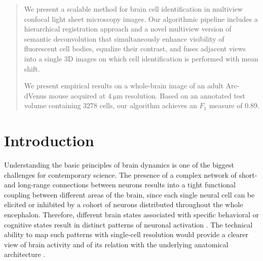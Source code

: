 \documentclass[smallextended]{svjour3}       %
\begin{document}
\maketitle

\begin{abstract}
  We present a scalable method for brain cell identification in
  multiview confocal light sheet microscopy images. Our algorithmic
  pipeline includes a hierarchical registration approach and a novel
  multiview version of semantic deconvolution that simultaneously
  enhance visibility of fluorescent cell bodies, equalize their
  contrast, and fuses adjacent views into a single 3D images on which
  cell identification is performed with mean shift.

  We present empirical results on a whole-brain image of an adult
  Arc-dVenus mouse acquired at $\SI{4}{\micro\meter}$
  resolution. Based on an annotated test volume containing 3278 cells,
  our algorithm achieves an $F_1$ measure of 0.89.

\end{abstract}

\section{Introduction}
\label{intro}
Understanding the basic principles of brain dynamics is one of the biggest challenges for contemporary
science. The presence of a complex network of short- and long-range connections between neurons
results into a tight functional coupling between different areas of the brain, since each single neural
cell can be elicited or inhibited by a cohort of neurons distributed throughout the whole encephalon.
Therefore, different brain states associated with specific behavioral or cognitive states result in
distinct patterns of neuronal activation \cite{alivisatos_brain_2012}. The technical ability to map such
patterns with single-cell resolution would provide a clearer view of brain activity and of its relation
with the underlying anatomical architecture \cite{oh_mesoscale_2014}.
\end{document}
